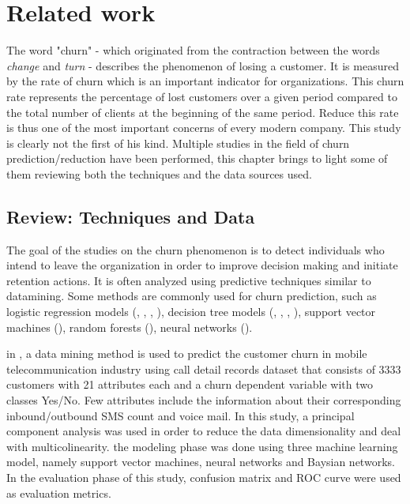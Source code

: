 \documentclass[LaM,binding=0.6cm, english]{sapthesis}
\begin{document}
\chapter{Related work}

The word "churn" - which originated from the contraction between the words \textit{change} and \textit{turn} - describes the phenomenon of losing a customer. It is measured by the rate of churn which is an important indicator for organizations. This churn rate represents the percentage of lost customers over a given period compared to the
total number of clients at the beginning of the same period. Reduce this rate is thus one of the most important concerns of every modern company. This study is clearly not the first of his kind. Multiple studies in the field of churn prediction/reduction have been performed, this chapter brings to light some of them reviewing both the techniques and the data sources used.

\section{Review: Techniques and Data}

The goal of the studies on the churn phenomenon is to detect individuals who intend to leave the organization in order to improve decision making and initiate retention actions. It is often analyzed using predictive techniques similar to datamining. Some methods are commonly used for churn prediction, such as logistic regression models (\cite{Nie2009}, \cite{Dahiya2015}, \cite{Yabas2013}, \cite{Rehman2013}), decision tree models (\cite{Dahiya2015}, \cite{Yabas2013}, \cite{Yabas2013}, \cite{Rehman2013}), support vector machines (\cite{Toderean2016}), random forests (\cite{Yabas2013}), neural networks (\cite{Rehman2013}).

\par in \cite{Toderean2016}, a data mining method is used to predict the customer churn in mobile telecommunication industry using call detail records dataset that consists of 3333 customers with 21 attributes each and a churn dependent variable with two classes Yes/No. Few attributes include the information about their corresponding inbound/outbound SMS count and voice mail. In this study, a principal component analysis was used in order to reduce the data dimensionality and deal with multicolinearity. the modeling phase was done using three machine learning model, namely support vector machines, neural networks and Baysian networks. In the evaluation phase of this study, confusion matrix and ROC curve were used as evaluation metrics.
\end{document}
